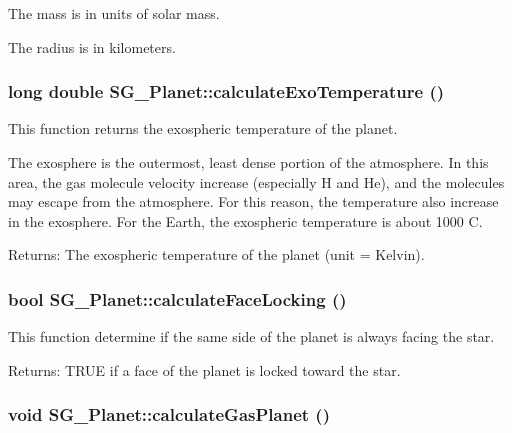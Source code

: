 The mass is in units of solar mass.

The radius is in kilometers. 
\subsubsection{\setlength{\rightskip}{0pt plus 5cm}long double SG\_\-Planet::calculate\-Exo\-Temperature ()\hspace{0.3cm}{\tt  [protected]}}\label{class_s_g___planet_b4}


This function returns the exospheric temperature of the planet. 

The exosphere is the outermost, least dense portion of the atmosphere. In this area, the gas molecule velocity increase (especially H and He), and the molecules may escape from the atmosphere. For this reason, the temperature also increase in the exosphere. For the Earth, the exospheric temperature is about 1000 C. \begin{Desc}
\item[Returns:]The exospheric temperature of the planet (unit = Kelvin). \end{Desc}
\subsubsection{\setlength{\rightskip}{0pt plus 5cm}bool SG\_\-Planet::calculate\-Face\-Locking ()\hspace{0.3cm}{\tt  [protected]}}\label{class_s_g___planet_b8}


This function determine if the same side of the planet is always facing the star. 

\begin{Desc}
\item[Returns:]TRUE if a face of the planet is locked toward the star. \end{Desc}
\subsubsection{\setlength{\rightskip}{0pt plus 5cm}void SG\_\-Planet::calculate\-Gas\-Planet ()\hspace{0.3cm}{\tt  [protected]}}\label{class_s_g___planet_b0}


